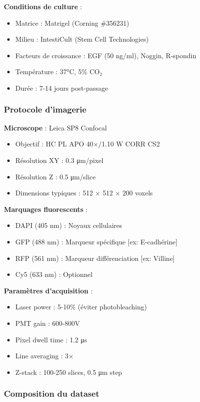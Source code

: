\textbf{Conditions de culture} :
\begin{itemize}
    \item Matrice : Matrigel (Corning \#356231)
    \item Milieu : IntestiCult (Stem Cell Technologies)
    \item Facteurs de croissance : EGF (50 ng/ml), Noggin, R-spondin
    \item Température : 37°C, 5\% CO₂
    \item Durée : 7-14 jours post-passage
\end{itemize}

\subsubsection{Protocole d'imagerie}

\textbf{Microscope} : Leica SP8 Confocal
\begin{itemize}
    \item Objectif : HC PL APO 40×/1.10 W CORR CS2
    \item Résolution XY : 0.3 μm/pixel
    \item Résolution Z : 0.5 μm/slice
    \item Dimensions typiques : 512 × 512 × 200 voxels
\end{itemize}

\textbf{Marquages fluorescents} :
\begin{itemize}
    \item DAPI (405 nm) : Noyaux cellulaires
    \item GFP (488 nm) : Marqueur spécifique [ex: E-cadhérine]
    \item RFP (561 nm) : Marqueur différenciation [ex: Villine]
    \item Cy5 (633 nm) : Optionnel
\end{itemize}

\textbf{Paramètres d'acquisition} :
\begin{itemize}
    \item Laser power : 5-10\% (éviter photobleaching)
    \item PMT gain : 600-800V
    \item Pixel dwell time : 1.2 μs
    \item Line averaging : 3×
    \item Z-stack : 100-250 slices, 0.5 μm step
\end{itemize}

\subsubsection{Composition du dataset}

